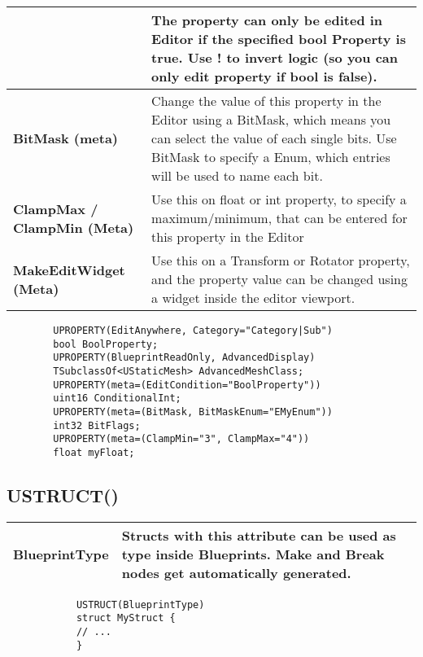 \documentclass[10pt,a4paper]{article}
\begin{document}
\begin{multicols*}{2}
\begin{tabularx}{\columnwidth}{|p{3.5cm}|X|}
		&  The property can only be edited in Editor if the specified bool Property is true. Use ! to invert logic (so you can only edit property if bool is false). \\
		\hline \textbf{BitMask (meta)}
		& Change the value of this property in the Editor using a BitMask, which means you can select the value of each single bits. Use BitMask to specify a Enum, which entries will be used to name each bit. \\
		\hline \textbf{ClampMax / ClampMin (Meta)}
		& Use this on float or int property, to specify a maximum/minimum, that can be entered for this property in the Editor \\
		\hline \textbf {MakeEditWidget (Meta)}
		& Use this on a Transform or Rotator property, and the property value can be changed using a widget inside the editor viewport. \\
		\hline
	\end{tabularx}

	\begin{minipage}{\columnwidth}
	\begin{verbatim}
		UPROPERTY(EditAnywhere, Category="Category|Sub")
		bool BoolProperty;
		UPROPERTY(BlueprintReadOnly, AdvancedDisplay)
		TSubclassOf<UStaticMesh> AdvancedMeshClass;
		UPROPERTY(meta=(EditCondition="BoolProperty"))
		uint16 ConditionalInt;
		UPROPERTY(meta=(BitMask, BitMaskEnum="EMyEnum"))
		int32 BitFlags;
		UPROPERTY(meta=(ClampMin="3", ClampMax="4"))
		float myFloat;
	\end{verbatim}
\end{minipage}

	
	\subsection{USTRUCT()}
	
	\begin{tabularx}{\columnwidth}{|p{3.5cm}|X|}
		\hline \textbf{BlueprintType}
		& Structs with this attribute can be used as type inside Blueprints. Make and Break nodes get automatically generated.\\
		\hline
	\end{tabularx}
	
	\begin{minipage}{\columnwidth}
		\begin{verbatim}
			USTRUCT(BlueprintType)
			struct MyStruct {
			// ...
			}	
		\end{verbatim}
	\end{minipage}
	

\end{multicols*}
\end{document}
